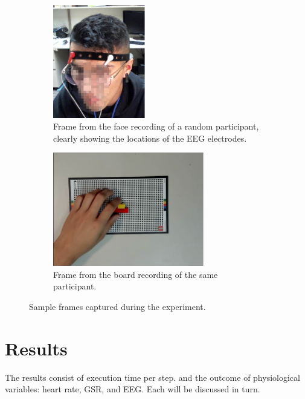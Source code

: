 \documentclass[10pt,letterpaper]{article}
\begin{document}
\begin{figure}[h]
  \centering
  \begin{subfigure}[t]{.35\textwidth}
    \centering
    \includegraphics[height=140pt]{images/participant.eps}
    \caption{Frame from the face recording of a random participant, clearly showing the locations of the EEG electrodes.}
  \end{subfigure}%
  \hfill%
  \begin{subfigure}[t]{.60\textwidth}
    \centering
    \includegraphics[height=140pt]{images/board_and_hand.eps}
    \caption{Frame from the board recording of the same participant.}
  \end{subfigure}
  \caption{Sample frames captured during the experiment.}\label{fig:sampleframes}
\end{figure}

\section{Results}\label{sec:results}

The results consist of execution time per step. and the outcome of physiological variables: heart rate, GSR, and EEG.\@
Each will be discussed in turn.
\end{document}
